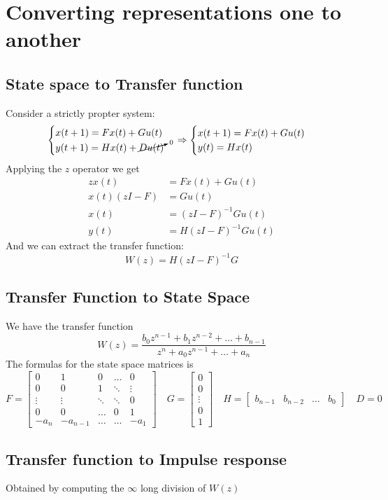 \documentclass{report}
\begin{document}
\section{Converting representations one to another}
\subsection{State space to Transfer function}
Consider a strictly propter system:
\[
\begin{cases}
x(t+1)=Fx(t)+Gu(t)\\
y(t+1)=Hx(t)+\cancelto{0}{Du(t)}
\end{cases}
\Rightarrow
\begin{cases}
x(t+1)=Fx(t)+Gu(t)\\
y(t)=Hx(t)
\end{cases}
\]
Applying the $z$ operator we get
\begin{align*}
zx(t)&=Fx(t)+Gu(t)\\
x(t)(zI-F)&=Gu(t)\\
x(t)&=(zI-F)^{-1}Gu(t)\\
y(t)&=H(zI-F)^{-1}Gu(t)
\end{align*}
And we can extract the transfer function:
\[
W(z)=H(zI-F)^{-1}G
\]

\subsection{Transfer Function to State Space}
We have the transfer function
\[
W(z)=\frac{b_0z^{n-1}+b_1z^{n-2}+\dots+b_{n-1}}{z^n+a_0z^{n-1}+\dots+a_n}
\]
The formulas for the state space matrices is
\[
F=
\begin{bmatrix}
0&1&0&\dots&0\\
0&0&1&\ddots&\vdots\\
\vdots&\vdots&\ddots&\ddots&0\\
0&0&\dots&0&1\\
-a_n&-a_{n-1}&\dots&\dots&-a_1
\end{bmatrix}
\quad
G=\begin{bmatrix}
0\\0\\\vdots\\0\\1
\end{bmatrix}
\quad
H=\begin{bmatrix}
b_{n-1}&b_{n-2}&\dots&b_0
\end{bmatrix}
\quad
D=0
\]

\subsection{Transfer function to Impulse response}
Obtained by computing the $\infty$ long division of $W(z)$
\end{document}

